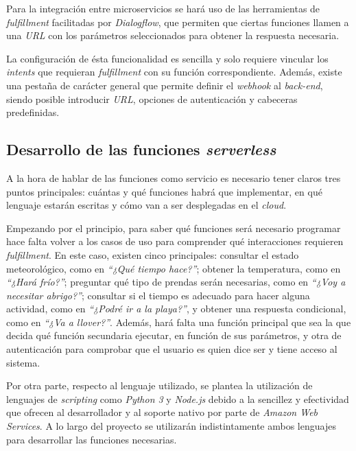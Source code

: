 \documentclass[11pt,spanish,listoffigures]{tfgetsinf}
\begin{document}
Para la integración entre microservicios se hará uso de las herramientas de \textit{fulfillment} facilitadas por \textit{Dialogflow}, que permiten que ciertas funciones llamen a una \textit{URL} con los parámetros seleccionados para obtener la respuesta necesaria.

La configuración de ésta funcionalidad es sencilla y solo requiere vincular los \textit{intents} que requieran \textit{fulfillment} con su función correspondiente. Además, existe una pestaña de carácter general que permite definir el \textit{webhook} al \textit{back-end}, siendo posible introducir \textit{URL}, opciones de autenticación y cabeceras predefinidas.

\subsection{Desarrollo de las funciones \textit{serverless}}
\label{subsec:desarrollo-funciones-serverless}

A la hora de hablar de las funciones como servicio es necesario tener claros tres puntos principales: cuántas y qué funciones habrá que implementar, en qué lenguaje estarán escritas y cómo van a ser desplegadas en el \textit{cloud}.

Empezando por el principio, para saber qué funciones será necesario programar hace falta volver a los casos de uso para comprender qué interacciones requieren \textit{fulfillment}. En este caso, existen cinco principales: consultar el estado meteorológico, como en \textit{“¿Qué tiempo hace?”}; obtener la temperatura, como en \textit{“¿Hará frío?”}; preguntar qué tipo de prendas serán necesarias, como en \textit{“¿Voy a necesitar abrigo?”}; consultar si el tiempo es adecuado para hacer alguna actividad, como en \textit{“¿Podré ir a la playa?”}, y obtener una respuesta condicional, como en \textit{“¿Va a llover?”}. Además, hará falta una función principal que sea la que decida qué función secundaria ejecutar, en función de sus parámetros, y otra de autenticación para comprobar que el usuario es quien dice ser y tiene acceso al sistema.

Por otra parte, respecto al lenguaje utilizado, se plantea la utilización de lenguajes de \textit{scripting} como \textit{Python 3} y \textit{Node.js} debido a la sencillez y efectividad que ofrecen al desarrollador y al soporte nativo por parte de \textit{Amazon Web Services}. A lo largo del proyecto se utilizarán indistintamente ambos lenguajes para desarrollar las funciones necesarias.
\end{document}
